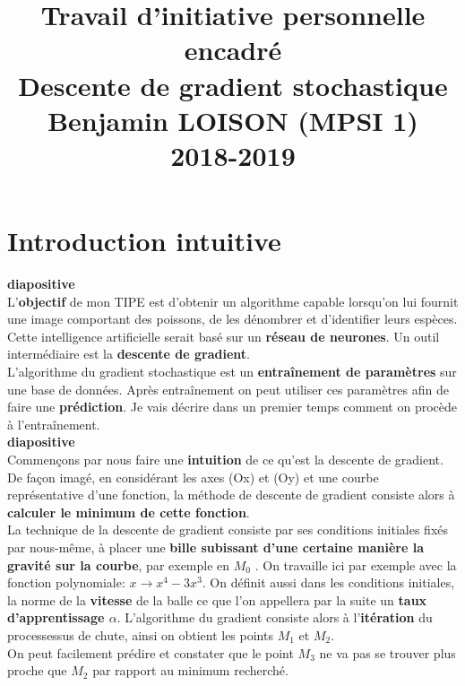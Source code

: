\documentclass{article}
\begin{document}
	\title{Travail d'initiative personnelle encadré\\
	\large Descente de gradient stochastique
	  \\Benjamin LOISON (MPSI 1)
		\\2018-2019}
	\date{}
	\maketitle

	\section{Introduction intuitive}
	
		\textbf{diapositive}\\
		
		L'\textbf{objectif} de mon TIPE est d'obtenir un algorithme capable lorsqu'on lui fournit une image comportant des poissons, de les dénombrer et d'identifier leurs espèces. Cette intelligence artificielle serait basé sur un \textbf{réseau de neurones}. Un outil intermédiaire est la \textbf{descente de gradient}.\\
		L'algorithme du gradient stochastique est un \textbf{entraînement de paramètres} %
		sur une base de données. Après entraînement on peut utiliser ces paramètres afin de faire une \textbf{prédiction}. Je vais décrire dans un premier temps comment on procède à l'entraînement.\\
		
		\textbf{diapositive}\\
		
		Commençons par nous faire une \textbf{intuition} de ce qu'est la descente de gradient. De façon imagé, en considérant les axes (Ox) et (Oy) et une courbe représentative d'une fonction, la méthode de descente de gradient consiste alors à \textbf{calculer le minimum de cette fonction}.\\
		La technique de la descente de gradient consiste par ses conditions initiales fixés par nous-même, à placer une \textbf{bille subissant d'une certaine manière la gravité sur la courbe}, par exemple en $M_0$%
		. On travaille ici par exemple avec la fonction polynomiale: $x \longrightarrow x^4 - 3x^3$. On définit aussi dans les conditions initiales, la norme de la \textbf{vitesse} de la balle ce que l'on appellera par la suite un \textbf{taux d'apprentissage $\alpha$}. L'algorithme du gradient consiste alors à l'\textbf{itération} du processessus de chute, ainsi on obtient les points $M_1$ et $M_2$.\\
		On peut facilement prédire et constater que le point $M_3$ ne va pas se trouver plus proche que $M_2$ par rapport au minimum recherché.\\
		
\end{document}
